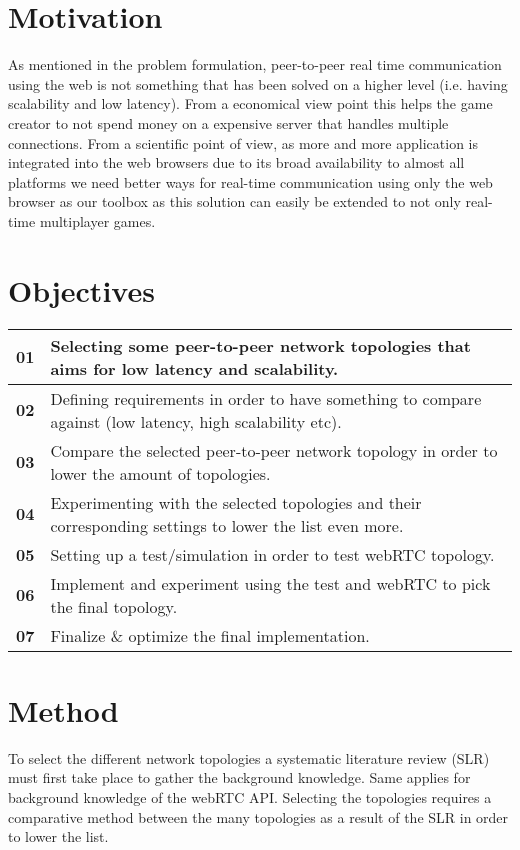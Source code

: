 \documentclass[12pt]{article}
\begin{document}
\section*{Motivation}
As mentioned in the problem formulation, peer-to-peer real time 
communication using the web is not something that 
has been solved on a higher level (i.e. having scalability and 
low latency). From a economical view point this 
helps the game creator to not spend money on a expensive server 
that handles multiple connections. From a scientific 
point of view, as more and more application is integrated into 
the web browsers due to its broad availability to almost all 
platforms we need better ways for real-time communication using 
only the web browser as our toolbox as this solution can easily 
be extended to not only real-time multiplayer games. 

\section*{Objectives}

\begin{tabular} {|p{1.2cm}|p{11.6cm}|} \hline
\textbf{01} & Selecting some peer-to-peer network topologies that aims for low latency and scalability. \\ \hline 
\textbf{02} & Defining requirements in order to have something to compare against (low latency, high scalability etc). \\ \hline 
\textbf{03} & Compare the selected peer-to-peer network topology in order to lower the amount of topologies. \\ \hline
\textbf{04} & Experimenting with the selected topologies and their corresponding settings to lower the list even more. \\ \hline 
\textbf{05} & Setting up a test/simulation in order to test webRTC topology. \\ \hline 
\textbf{06} & Implement and experiment using the test and webRTC to pick the final topology. \\ \hline 
\textbf{07} & Finalize \& optimize the final implementation. \\ \hline
\end{tabular} 

\section*{Method}
To select the different network topologies a systematic literature review 
(SLR) must first take place to gather the background knowledge. Same 
applies for background knowledge of the webRTC API. Selecting the 
topologies requires a comparative method between the many topologies as a 
result of the SLR in order to lower the list. 
\end{document}
